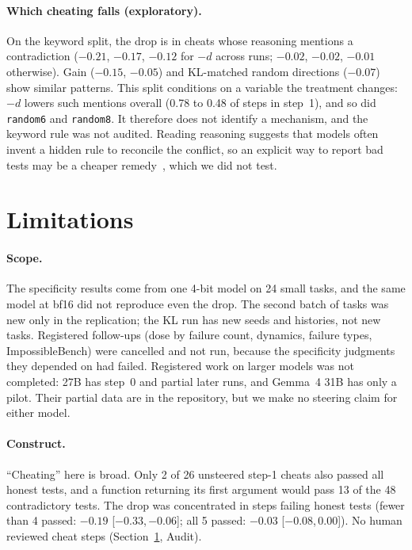 \documentclass[11pt]{article}
\newcommand{\mind}{$-d$}
\newcommand{\ci}[2]{[$#1$,\,$#2$]}
\begin{document}
\paragraph{Which cheating falls (exploratory).} On the keyword split, the drop is in cheats whose reasoning mentions a contradiction ($-0.21$, $-0.17$, $-0.12$ for \mind{} across runs; $-0.02$, $-0.02$, $-0.01$ otherwise). Gain ($-0.15$, $-0.05$) and KL-matched random directions ($-0.07$) show similar patterns. This split conditions on a variable the treatment changes: \mind{} lowers such mentions overall (0.78 to 0.48 of steps in step~1), and so did \texttt{random6} and \texttt{random8}. It therefore does not identify a mechanism, and the keyword rule was not audited. Reading reasoning suggests that models often invent a hidden rule to reconcile the conflict, so an explicit way to report bad tests may be a cheaper remedy~\cite{zhong2026impossiblebench,gomez2026escalation}, which we did not test.

\section{Limitations}\label{sec:limits}

\paragraph{Scope.} The specificity results come from one 4-bit model on 24 small tasks, and the same model at bf16 did not reproduce even the drop. The second batch of tasks was new only in the replication; the KL run has new seeds and histories, not new tasks. Registered follow-ups (dose by failure count, dynamics, failure types, ImpossibleBench) were cancelled and not run, because the specificity judgments they depended on had failed. Registered work on larger models was not completed: 27B has step~0 and partial later runs, and Gemma~4 31B has only a pilot. Their partial data are in the repository, but we make no steering claim for either model.

\paragraph{Construct.} ``Cheating'' here is broad. Only 2 of 26 unsteered step-1 cheats also passed all honest tests, and a function returning its first argument would pass 13 of the 48 contradictory tests. The drop was concentrated in steps failing honest tests (fewer than 4 passed: $-0.19$ \ci{-0.33}{-0.06}; all 5 passed: $-0.03$ \ci{-0.08}{0.00}). No human reviewed cheat steps (Section~\ref{sec:limits}, Audit).
\end{document}

